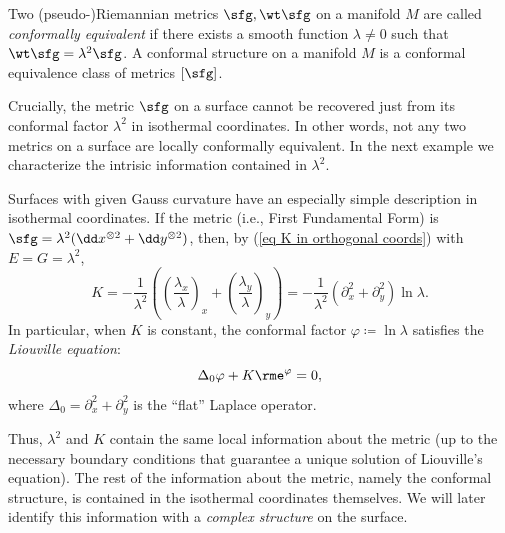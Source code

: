 \begin{defn}
    Two (pseudo-)Riemannian metrics $\sfg,\wt\sfg$ on a manifold $M$ are called \emph{conformally equivalent} if there exists a smooth function $\lambda\neq 0$ such that $\wt\sfg=\lambda^2 \sfg$. A conformal structure on a manifold $M$ is a conformal equivalence class of metrics $[\sfg]$.
\end{defn}

Crucially, the metric $\sfg$ on a surface cannot be recovered just from its conformal factor $\lambda^2$ in isothermal coordinates. In other words, not any two metrics on a surface are locally conformally equivalent. In the next example we characterize the intrisic information contained in $\lambda^2$.

\begin{example}
    Surfaces with given Gauss curvature have an especially simple description in isothermal coordinates. If the metric (i.e., First Fundamental Form) is $\sfg=\lambda^2(\dd x^{\otimes 2}+\dd y^{\otimes 2})$, then, by (\ref{eq K in orthogonal coords}) with $E=G=\lambda^2$,
    \[K=-\frac{1}{\lambda^2}\left(\left(\frac{\lambda_x}{\lambda}\right)_x+\left(\frac{\lambda_y}{\lambda}\right)_y \right)=-\frac{1}{\lambda^2}(\partial_x^2+\partial_y^2)\ln\lambda.\label{eq K in isothermal coords}\]
    In particular, when $K$ is constant, the conformal factor $\varphi\coloneqq \ln\lambda$ satisfies the \emph{Liouville equation}:
    \[\Delta_0 \varphi+K\rme^{\varphi}=0,\label{eq liouville general}\]
    where $\Delta_0=\partial_x^2+\partial_y^2$ is the ``flat'' Laplace operator.
\end{example}

Thus, $\lambda^2$ and $K$ contain the same local information about the metric (up to the necessary boundary conditions that guarantee a unique solution of Liouville's equation). The rest of the information about the metric, namely the conformal structure, is contained in the isothermal coordinates themselves. We will later identify this information with a \emph{complex structure} on the surface.

